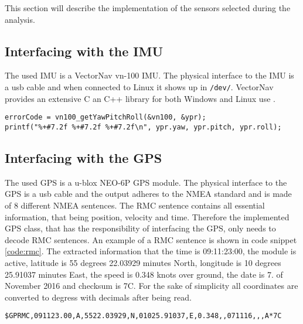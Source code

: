 \label{sub:implementation_of_sensors}
This section will describe the implementation of the sensors selected during the analysis.


\subsection{Interfacing with the IMU}\label{sec:interface_IMU}
The used IMU is a VectorNav vn-100 IMU.
The physical interface to the IMU is a usb cable and when connected to Linux it shows up in \texttt{/dev/}.
VectorNav provides an extensive C an C++ library for both Windows and Linux use \cite{vectornav}. 


\begin{lstlisting}[caption=IMU CODE......,label=code:rmc]
errorCode = vn100_getYawPitchRoll(&vn100, &ypr);
printf("%+#7.2f %+#7.2f %+#7.2f\n", ypr.yaw, ypr.pitch, ypr.roll);
\end{lstlisting}

\subsection{Interfacing with the GPS}\label{sec:interface_GPS}
The used GPS is a u-blox NEO-6P GPS module.
The physical interface to the GPS is a usb cable and the output adheres to the NMEA standard and is made of 8 different NMEA sentences.
The RMC sentence contains all essential information, that being position, velocity and time.
Therefore the implemented GPS class, that has the responsibility of interfacing the GPS, only needs to decode RMC sentences.
An example of a RMC sentence is shown in code snippet \ref{code:rmc}.
The extracted information that the time is 09:11:23:00, the module is active, latitude is 55 degrees 22.03929 minutes North, longitude is 10 degrees 25.91037 minutes East, the speed is 0.348 knots over ground, the date is 7. of November 2016 and checksum is 7C.
For the sake of simplicity all coordinates are converted to degress with decimals after being read. 

\begin{lstlisting}[caption=RMC sentence.,label=code:rmc]
$GPRMC,091123.00,A,5522.03929,N,01025.91037,E,0.348,,071116,,,A*7C
\end{lstlisting}

